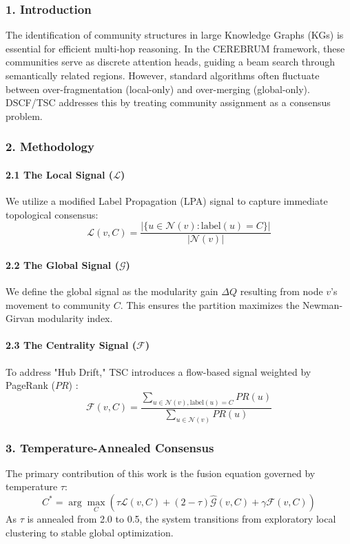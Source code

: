 \documentclass[10pt,journal,compsoc]{IEEEtran}
\begin{document}
\subsubsection{1. Introd\-uction}
The ident\-ification of community structures in large Knowledge Graphs (KGs) is essential for efficient multi-hop reasoning. In the CEREBRUM framework, these communities serve as discrete attention heads, guiding a beam search through seman\-tically related regions. However, standard algorithms often fluctuate between over-fragm\-entation (local-only) and over-merging (global-only). DSCF/TSC addresses this by treating community assignment as a consensus problem.

\subsubsection{2. Methodology}

\paragraph{2.1 The Local Signal ($\mathcal{L}$)}
We utilize a modified Label Propagation (LPA) \cite{raghavan2007lpa} signal to capture immediate topological consensus:
\begin{equation}
\mathcal{L}(v, C) = \frac{|\{u \in \mathcal{N}(v) : \text{label}(u) = C\}|}{|\mathcal{N}(v)|}
\end{equation}

\paragraph{2.2 The Global Signal ($\mathcal{G}$)}
We define the global signal as the modularity gain $\Delta Q$ resulting from node $v$'s movement to community $C$. This ensures the partition maximizes the Newman-Girvan modularity index.

\paragraph{2.3 The Centrality Signal ($\mathcal{F}$)}
To address "Hub Drift," TSC introduces a flow-based signal weighted by PageRank ($PR$) \cite{page1999pagerank}:
\begin{equation}
\mathcal{F}(v, C) = \frac{\sum_{u \in \mathcal{N}(v), \text{label}(u)=C} PR(u)}{\sum_{u \in \mathcal{N}(v)} PR(u)}
\end{equation}

\subsubsection{3. Temperature-Annealed Consensus}
The primary contr\-ibution of this work is the fusion equation governed by temperature $\tau$:
\begin{equation}
C^* = \arg\max_{C} ( \tau \mathcal{L}(v, C) + (2 - \tau) \widehat{\mathcal{G}}(v, C) + \gamma \mathcal{F}(v, C) )
\end{equation}
As $\tau$ is annealed from 2.0 to 0.5, the system transitions from exploratory local clustering to stable global optim\-ization.
\end{document}
